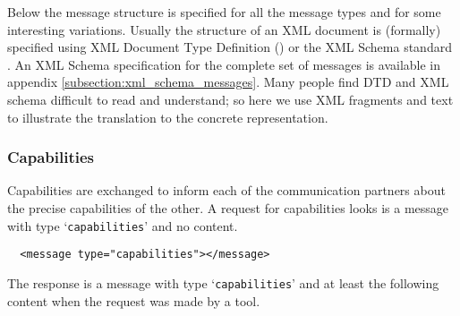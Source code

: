 \documentclass{article}
\begin{document}
    \noindent Below the message structure is specified for all the
    message types and for some interesting variations. Usually the structure
    of an XML document is (formally) specified using XML Document Type
    Definition (\cite{Sperberg-McQueen:06:EML}) or the XML Schema standard
    \cite{Malhotra:06:XSP}. An XML Schema specification for the complete set of
    messages is available in appendix \ref{subsection:xml_schema_messages}. Many people
    find DTD and XML schema difficult to read and understand; so here we use 
    XML fragments and text to illustrate the translation to the
    concrete representation.


   

  \subsubsection{Capabilities}

   Capabilities are exchanged to inform each of the communication partners
   about the precise capabilities of the other. A request for capabilities
   looks is a message with type `\texttt{capabilities}' and no content.

   \small \begin{verbatim}
  <message type="capabilities"></message>\end{verbatim}
  \normalsize

   The response is a message with type `\texttt{capabilities}' and at least the
   following content when the request was made by a tool.
\end{document}
